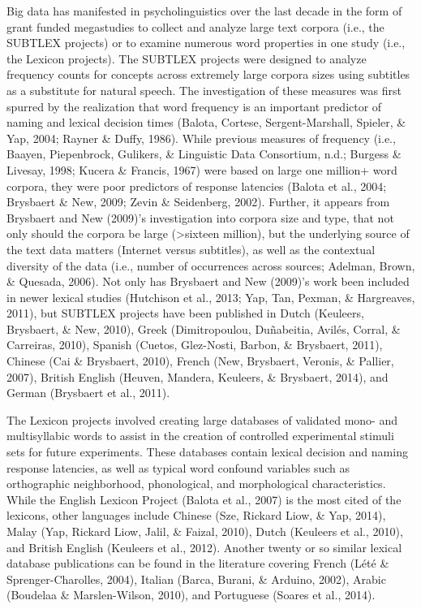\documentclass[english,man]{apa6}
\theoremstyle{definition}
\theoremstyle{definition}
\theoremstyle{definition}
\theoremstyle{remark}
\begin{document}
Big data has manifested in psycholinguistics over the last decade in the
form of grant funded megastudies to collect and analyze large text
corpora (i.e., the SUBTLEX projects) or to examine numerous word
properties in one study (i.e., the Lexicon projects). The SUBTLEX
projects were designed to analyze frequency counts for concepts across
extremely large corpora sizes using subtitles as a substitute for
natural speech. The investigation of these measures was first spurred by
the realization that word frequency is an important predictor of naming
and lexical decision times (Balota, Cortese, Sergent-Marshall, Spieler,
\& Yap, 2004; Rayner \& Duffy, 1986). While previous measures of
frequency (i.e., Baayen, Piepenbrock, Gulikers, \& Linguistic Data
Consortium, n.d.; Burgess \& Livesay, 1998; Kucera \& Francis, 1967)
were based on large one million+ word corpora, they were poor predictors
of response latencies (Balota et al., 2004; Brysbaert \& New, 2009;
Zevin \& Seidenberg, 2002). Further, it appears from Brysbaert and New
(2009)'s investigation into corpora size and type, that not only should
the corpora be large (\textgreater{}sixteen million), but the underlying
source of the text data matters (Internet versus subtitles), as well as
the contextual diversity of the data (i.e., number of occurrences across
sources; Adelman, Brown, \& Quesada, 2006). Not only has Brysbaert and
New (2009)'s work been included in newer lexical studies (Hutchison et
al., 2013; Yap, Tan, Pexman, \& Hargreaves, 2011), but SUBTLEX projects
have been published in Dutch (Keuleers, Brysbaert, \& New, 2010), Greek
(Dimitropoulou, Duñabeitia, Avilés, Corral, \& Carreiras, 2010), Spanish
(Cuetos, Glez-Nosti, Barbon, \& Brysbaert, 2011), Chinese (Cai \&
Brysbaert, 2010), French (New, Brysbaert, Veronis, \& Pallier, 2007),
British English (Heuven, Mandera, Keuleers, \& Brysbaert, 2014), and
German (Brysbaert et al., 2011).

The Lexicon projects involved creating large databases of validated
mono- and multisyllabic words to assist in the creation of controlled
experimental stimuli sets for future experiments. These databases
contain lexical decision and naming response latencies, as well as
typical word confound variables such as orthographic neighborhood,
phonological, and morphological characteristics. While the English
Lexicon Project (Balota et al., 2007) is the most cited of the lexicons,
other languages include Chinese (Sze, Rickard Liow, \& Yap, 2014), Malay
(Yap, Rickard Liow, Jalil, \& Faizal, 2010), Dutch (Keuleers et al.,
2010), and British English (Keuleers et al., 2012). Another twenty or so
similar lexical database publications can be found in the literature
covering French (Lété \& Sprenger-Charolles, 2004), Italian (Barca,
Burani, \& Arduino, 2002), Arabic (Boudelaa \& Marslen-Wilson, 2010),
and Portuguese (Soares et al., 2014).
\end{document}

